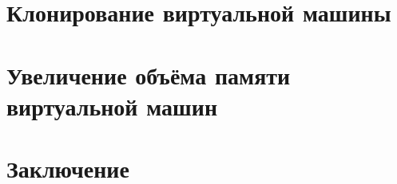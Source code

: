 \documentclass[oneside,final,12pt]{extarticle} %
\begin{document}
\section{Клонирование виртуальной машины}
%
\newpage

\section{Увеличение объёма памяти виртуальной машин}
%
\newpage

\section*{Заключение}
\newpage

\begin{thebibliography}[]

\end{thebibliography}
\newpage
\appendix
\end{document}
